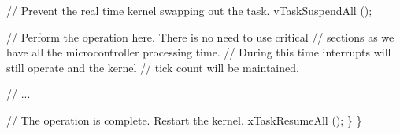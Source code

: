 \begin{DoxyPre}     // Prevent the real time kernel swapping out the task.
     vTaskSuspendAll ();\end{DoxyPre}



\begin{DoxyPre}     // Perform the operation here.  There is no need to use critical
     // sections as we have all the microcontroller processing time.
     // During this time interrupts will still operate and the kernel
     // tick count will be maintained.\end{DoxyPre}



\begin{DoxyPre}     // ...\end{DoxyPre}



\begin{DoxyPre}     // The operation is complete.  Restart the kernel.
     xTaskResumeAll ();
    \}
\}
  \end{DoxyPre}
 